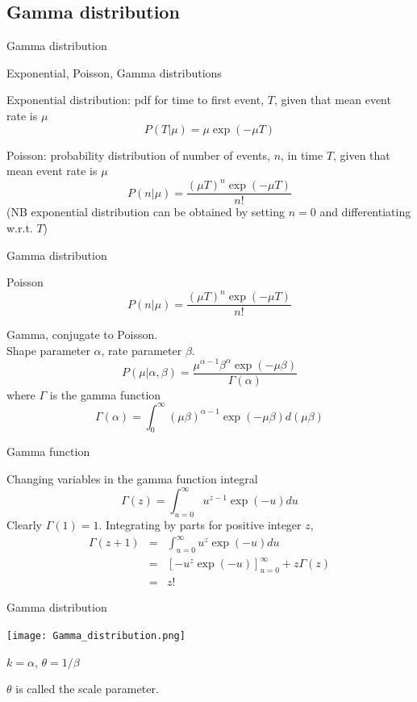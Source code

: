 \documentclass{beamer}
\begin{document}
\subsection{Gamma distribution}

\begin{frame}{Gamma distribution}

\itemb
\item Exponential, Poisson, Gamma distributions
 \itemb
 \item Exponential distribution: pdf for time to first event, $T$, given that mean event rate is $\mu$
\[
P(T|\mu) = \mu \exp(-\mu T)
\]
 \item Poisson: probability distribution of number of events, $n$, in time $T$, given that mean event rate is $\mu$
\[
P(n|\mu) = \frac{(\mu T)^n \exp(-\mu T)}{n!}
\]
(NB exponential distribution can be obtained by setting $n=0$ and differentiating w.r.t. $T$)
\iteme
\iteme


\end{frame}


\begin{frame}{Gamma distribution}

\itemb
 \item Poisson
\[
P(n|\mu) = \frac{(\mu T)^n \exp(-\mu T)}{n!}
\]
 \item Gamma, conjugate to Poisson. \\
Shape parameter $\alpha$, rate parameter $\beta$.
\[
P(\mu|\alpha,\beta) = \frac{\mu^{\alpha-1} \beta^\alpha \exp(-\mu \beta)}{\Gamma(\alpha)}
\]
where $\Gamma$ is the \alert{gamma function}
\[
\Gamma(\alpha) = \int_0^{\infty} (\mu\beta)^{\alpha-1} \exp(-\mu \beta) d(\mu \beta)
\]
\iteme


\end{frame}


\begin{frame}{Gamma function}

Changing variables in the gamma function integral
\[
\Gamma(z) = \int_{u=0}^\infty u^{z-1} \exp(-u) du
\]
Clearly $\Gamma(1)=1$. Integrating by parts for positive integer $z$,
\begin{eqnarray*}
\Gamma(z+1) & = & \int_{u=0}^\infty u^z \exp(-u) du \\
& = & \left[ -u^z \exp(-u) \right]_{u=0}^\infty + z \Gamma(z) \\
& = & z!
\end{eqnarray*}


\end{frame}

\begin{frame}{Gamma distribution}

  \texttt{[image: Gamma\_distribution.png]}

$k=\alpha$, $\theta = 1/\beta$

$\theta$ is called the scale parameter.

\end{frame}
\end{document}

